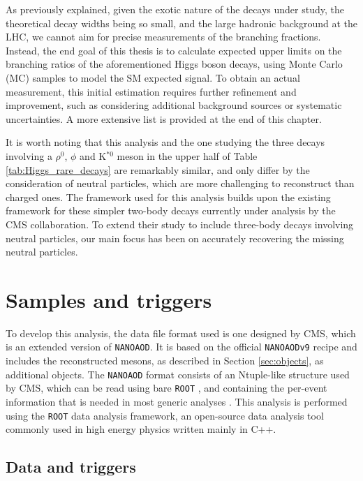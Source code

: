 As previously explained, given the exotic nature of the decays under study, the theoretical decay widths being so small, and the large hadronic background at the LHC, we cannot aim for precise measurements of the branching fractions. Instead, the end goal of this thesis is to calculate expected upper limits on the branching ratios of the aforementioned Higgs boson decays, using Monte Carlo (MC) samples to model the SM expected signal. To obtain an actual measurement, this initial estimation requires further refinement and improvement, such as considering additional background sources or systematic uncertainties. A more extensive list is provided at the end of this chapter.

It is worth noting that this analysis and the one studying the three decays involving a $\rho^0$, $\phi$ and K$^{*0}$ meson in the upper half of Table \ref{tab:Higgs_rare_decays} are remarkably similar, and only differ by the consideration of neutral particles, which are more challenging to reconstruct than charged ones. The framework used for this analysis builds upon the existing framework for these simpler two-body decays currently under analysis by the CMS collaboration. To extend their study to include three-body decays involving neutral particles, our main focus has been on accurately recovering the missing neutral particles.

\section{Samples and triggers}\label{sec:samples_triggers}

To develop this analysis, the data file format used is one designed by CMS, which is an extended version of \verb+NANOAOD+. It is based on the official \verb+NANOAODv9+ recipe and includes the reconstructed mesons, as described in Section \ref{sec:objects}, as additional objects. The \verb+NANOAOD+ format consists of an Ntuple-like structure used by CMS, which can be read using bare \verb+ROOT+ \cite{CERN:root}, and containing the per-event information that is needed in most generic analyses \cite{CMS:NanoAOD}. This analysis is performed using the \verb+ROOT+ data analysis framework, an open-source data analysis tool commonly used in high energy physics written mainly in C++.

\subsection{Data and triggers}\label{subsec:data_tau_trigger}

